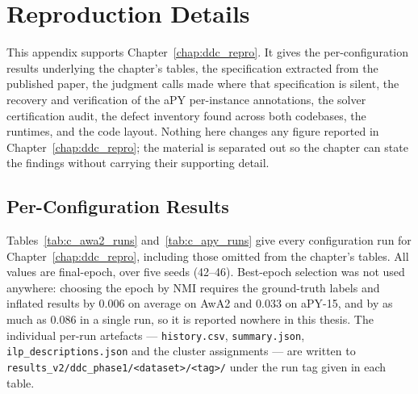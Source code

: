 \chapter{Reproduction Details}
\label{app:reproduction}

This appendix supports Chapter~\ref{chap:ddc_repro}. It gives the per-configuration results underlying the chapter's tables, the specification extracted from the published paper, the judgment calls made where that specification is silent, the recovery and verification of the aPY per-instance annotations, the solver certification audit, the defect inventory found across both codebases, the runtimes, and the code layout. Nothing here changes any figure reported in Chapter~\ref{chap:ddc_repro}; the material is separated out so the chapter can state the findings without carrying their supporting detail.

\section{Per-Configuration Results}
\label{sec:c_perseed}

Tables~\ref{tab:c_awa2_runs} and~\ref{tab:c_apy_runs} give every configuration run for Chapter~\ref{chap:ddc_repro}, including those omitted from the chapter's tables. All values are final-epoch, over five seeds (42--46). Best-epoch selection was not used anywhere: choosing the epoch by NMI requires the ground-truth labels and inflated results by $0.006$ on average on AwA2 and $0.033$ on aPY-15, and by as much as $0.086$ in a single run, so it is reported nowhere in this thesis. The individual per-run artefacts --- \texttt{history.csv}, \texttt{summary.json}, \texttt{ilp\_descriptions.json} and the cluster assignments --- are written to \texttt{results\_v2/ddc\_phase1/<dataset>/<tag>/} under the run tag given in each table.

